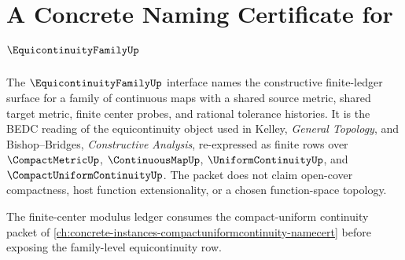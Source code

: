 \chapter{A Concrete Naming Certificate for $\EquicontinuityFamilyUp$}
\label{ch:concrete-instances-equicontinuityfamily-namecert}

The $\EquicontinuityFamilyUp$ interface names the constructive finite-ledger
surface for a family of continuous maps with a shared source metric, shared
target metric, finite center probes, and rational tolerance histories. It is
the BEDC reading of the equicontinuity object used in Kelley, \emph{General
Topology}, and Bishop--Bridges, \emph{Constructive Analysis}, re-expressed
as finite rows over $\CompactMetricUp$, $\ContinuousMapUp$,
$\UniformContinuityUp$, and $\CompactUniformContinuityUp$. The packet does
not claim open-cover compactness, host function extensionality, or a chosen
function-space topology.

The finite-center modulus ledger consumes the compact-uniform continuity packet of \autoref{ch:concrete-instances-compactuniformcontinuity-namecert} before exposing the family-level equicontinuity row.

